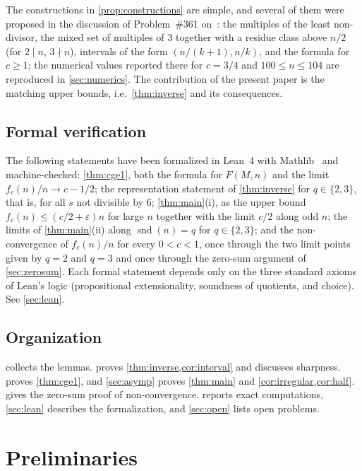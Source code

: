 \documentclass[11pt,reqno]{amsart}
\numberwithin{equation}{section}
\theoremstyle{definition}
\theoremstyle{remark}
\newcommand{\eps}{\varepsilon}
\newcommand{\snd}{\operatorname{snd}}
\begin{document}
The constructions in \cref{prop:constructions} are simple, and several of them were proposed in the discussion of Problem~\#361 on~\cite{Bl}: the multiples of the least non-divisor, the mixed set of multiples of $3$ together with a residue class above $n/2$ (for $2\mid n$, $3\nmid n$), intervals of the form $(n/(k+1),n/k)$, and the formula for $c\ge1$; the numerical values reported there for $c=3/4$ and $100\le n\le104$ are reproduced in \cref{sec:numerics}. The contribution of the present paper is the matching upper bounds, i.e.\ \cref{thm:inverse} and its consequences.

\subsection{Formal verification}
The following statements have been formalized in Lean~4 with Mathlib~\cite{Lean4,mathlib} and machine-checked: \cref{thm:cge1}, both the formula for $F(M,n)$ and the limit $f_c(n)/n\to c-1/2$; the representation statement of \cref{thm:inverse} for $q\in\{2,3\}$, that is, for all $s$ not divisible by $6$; \cref{thm:main}(i), as the upper bound $f_c(n)\le(c/2+\eps)n$ for large $n$ together with the limit $c/2$ along odd $n$; the limits of \cref{thm:main}(ii) along $\snd(n)=q$ for $q\in\{2,3\}$; and the non-convergence of $f_c(n)/n$ for every $0<c<1$, once through the two limit points given by $q=2$ and $q=3$ and once through the zero-sum argument of \cref{sec:zerosum}. Each formal statement depends only on the three standard axioms of Lean's logic (propositional extensionality, soundness of quotients, and choice). See \cref{sec:lean}.

\subsection{Organization}
 collects the lemmas.  proves \cref{thm:inverse,cor:interval} and discusses sharpness.  proves \cref{thm:cge1}, and \cref{sec:asymp} proves \cref{thm:main} and \cref{cor:irregular,cor:half}.  gives the zero-sum proof of non-convergence.  reports exact computations, \cref{sec:lean} describes the formalization, and \cref{sec:open} lists open problems.

\section{Preliminaries}\label{sec:prelim}
\end{document}
